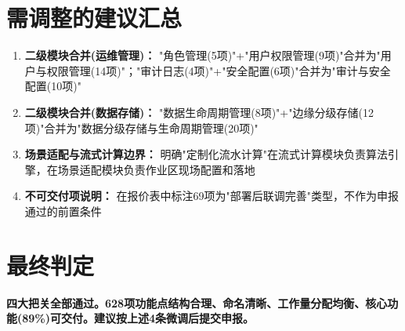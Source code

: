 \documentclass[11pt,a4paper]{ctexart}
\begin{document}
\section{需调整的建议汇总}

\begin{enumerate}[leftmargin=*]
  \item \textbf{二级模块合并(运维管理)：} "角色管理(5项)"+"用户权限管理(9项)"合并为"用户与权限管理(14项)"；"审计日志(4项)"+"安全配置(6项)"合并为"审计与安全配置(10项)"
  \item \textbf{二级模块合并(数据存储)：} "数据生命周期管理(8项)"+"边缘分级存储(12项)"合并为"数据分级存储与生命周期管理(20项)"
  \item \textbf{场景适配与流式计算边界：} 明确"定制化流水计算"在流式计算模块负责算法引擎，在场景适配模块负责作业区现场配置和落地
  \item \textbf{不可交付项说明：} 在报价表中标注69项为"部署后联调完善"类型，不作为申报通过的前置条件
\end{enumerate}

\section{最终判定}

\color{ok}\textbf{四大把关全部通过。628项功能点结构合理、命名清晰、工作量分配均衡、核心功能(89\%)可交付。建议按上述4条微调后提交申报。}
\end{document}
